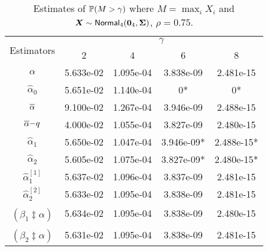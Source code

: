 \begin{table}[H]
\centering
\begin{tabular}{ccccc}
\toprule
\multirow{2}{*}{Estimators} & \multicolumn{4}{c}{$\gamma$} \\
                            & 2    & 4    & 6    & 8    \\
\midrule
$\alpha$ & 5.633e-02 & 1.095e-04 & 3.838e-09 & 2.481e-15 \\
\rowcolor{Gray} $\hat{\alpha}_0$ & 5.651e-02 & 1.140e-04 & 0* & 0* \\
$\overline{\alpha}$ & 9.100e-02 & 1.267e-04 & 3.946e-09 & 2.488e-15 \\
\rowcolor{Gray} $\overline{\alpha}{-}q$ & 4.000e-02 & 1.055e-04 & 3.827e-09 & 2.480e-15 \\
$\hat{\alpha}_1$ & 5.650e-02 & 1.047e-04 & 3.946e-09* & 2.488e-15* \\
\rowcolor{Gray} $\hat{\alpha}_2$ & 5.605e-02 & 1.075e-04 & 3.827e-09* & 2.480e-15* \\
$\hat{\alpha}_1^{[1]}$ & 5.637e-02 & 1.096e-04 & 3.837e-09 & 2.481e-15 \\
\rowcolor{Gray} $\hat{\alpha}_2^{[2]}$ & 5.633e-02 & 1.095e-04 & 3.838e-09 & 2.481e-15 \\
$\widehat{(\beta_1 \ddagger \alpha)}$ & 5.634e-02 & 1.095e-04 & 3.838e-09 & 2.480e-15 \\
\rowcolor{Gray} $\widehat{(\beta_2 \ddagger \alpha)}$ & 5.631e-02 & 1.095e-04 & 3.838e-09 & 2.481e-15 \\
\bottomrule
\end{tabular}
\caption{Estimates of $\operatorname{{\mathbb P}}(M>\gamma)$ where $M=\max_i X_i$ and $\bm{X} \sim \mathsf{Normal}_4(\bm{0}_4, \bm{\Sigma})$, $\rho = 0.75$.}
\label{table:norm_ests}
\end{table}

\vspace{-2em}

